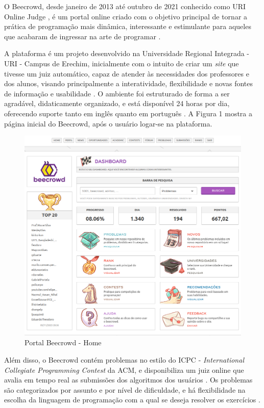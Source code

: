 O Beecrowd, desde janeiro de 2013 até outubro de 2021 conhecido como URI Online Judge \cite[p.~5]{piekarski}, é um portal online criado com o objetivo principal de tornar a prática de programação mais dinâmica, interessante e estimulante para aqueles que acabaram de ingressar na arte de programar \cite[p.~1]{beztonin2012}.

A plataforma é um projeto desenvolvido na Universidade Regional Integrada - URI - Campus de Erechim, inicialmente com o intuito de criar um \textit{site} que tivesse um juiz automático, capaz de atender às necessidades dos professores e dos alunos, visando principalmente a interatividade, flexibilidade e novas fontes de informação e usabilidade \cite[p.~1]{beztonin2012}. O ambiente foi estruturado de forma a ser agradável, didaticamente organizado, e está disponível 24 horas por dia, oferecendo suporte tanto em inglês quanto em português \cite[p.~239]{beztonin2014}. A Figura 1 mostra a página inicial do Beecrowd, após o usuário logar-se na plataforma.

\begin{figure}[h!]
	   \centering
            \caption{Portal Beecrowd - Home}
            \label{fig:BeecrowdHome}
	   	\includegraphics[scale=0.3]{pictures/beecrowd_home.png}
\end{figure}

Além disso, o Beecrowd contém problemas no estilo do ICPC - \textit{International Collegiate Programming Contest} da ACM, e disponibiliza um juiz online que avalia em tempo real as submissões dos algoritmos dos usuários \cite[p.~350]{berssanettefrancisco}. Os problemas são categorizados por assunto e por nível de dificuldade, e há flexibilidade na escolha da linguagem de programação com a qual se deseja resolver os exercícios \cite[p.~1]{beztonin2012}.

